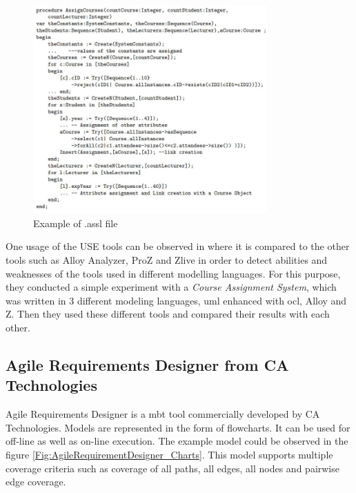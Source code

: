 \begin{figure} [htbp!]
	\centering
					\includegraphics[width=0.8\textwidth]{figures/USE_test_generation.JPG}
					\caption{\label{Fig:USE_test_generation} Example of .assl file \cite{USE_Alloy_Z_comparison}}
\end{figure}

\par
One usage of the USE tools can be observed in \cite{USE_Alloy_Z_comparison} where it is compared to the other tools such as Alloy Analyzer, ProZ and Zlive in order to detect abilities and weaknesses of the tools used in different modelling languages. For this purpose, they conducted a simple experiment with a \textit{Course Assignment System}, which was written in 3 different modeling languages, \acrshort{uml} enhanced with \acrshort{ocl}, Alloy and Z. Then they used these different tools and compared their results with each other.

\subsection{Agile Requirements Designer from CA Technologies}
\par
Agile Requirements Designer is a \acrshort{mbt} tool commercially developed by CA Technologies. Models are represented in the form of flowcharts. It can be used for off-line as well as on-line execution. The example model could be observed in the figure \ref{Fig:AgileRequirementDesigner_Charts}. This model supports multiple coverage criteria such as coverage of all paths, all edges, all nodes and pairwise edge coverage.

